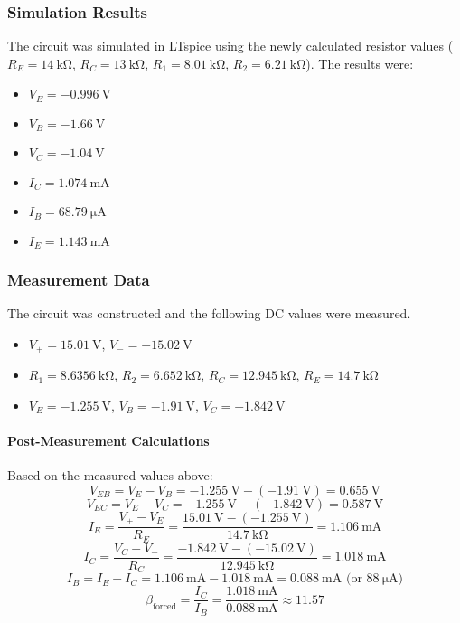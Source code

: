 \documentclass[12pt]{article}
\begin{document}
\subsubsection{Simulation Results}
The circuit was simulated in LTspice using the newly calculated resistor values ($R_E=\SI{14}{\kilo\ohm}$, $R_C=\SI{13}{\kilo\ohm}$, $R_1=\SI{8.01}{\kilo\ohm}$, $R_2=\SI{6.21}{\kilo\ohm}$). The results were:
\begin{itemize}
    \item $V_E = \SI{-0.996}{\volt}$
    \item $V_B = \SI{-1.66}{\volt}$
    \item $V_C = \SI{-1.04}{\volt}$
    \item $I_C = \SI{1.074}{\milli\ampere}$
    \item $I_B = \SI{68.79}{\micro\ampere}$
    \item $I_E = \SI{1.143}{\milli\ampere}$
\end{itemize}

\subsubsection{Measurement Data}
The circuit was constructed and the following DC values were measured.
\begin{itemize}
    \item $V_+ = \SI{15.01}{\volt}$, $V_- = \SI{-15.02}{\volt}$
    \item $R_1 = \SI{8.6356}{\kilo\ohm}$, $R_2 = \SI{6.652}{\kilo\ohm}$, $R_C = \SI{12.945}{\kilo\ohm}$, $R_E = \SI{14.7}{\kilo\ohm}$ %
    \item $V_E = \SI{-1.255}{\volt}$, $V_B = \SI{-1.91}{\volt}$, $V_C = \SI{-1.842}{\volt}$
\end{itemize}

\paragraph{Post-Measurement Calculations}
Based on the measured values above:
$$
V_{EB} = V_E - V_B = \SI{-1.255}{\volt} - (\SI{-1.91}{\volt}) = \SI{0.655}{\volt}
$$
$$
V_{EC} = V_E - V_C = \SI{-1.255}{\volt} - (\SI{-1.842}{\volt}) = \SI{0.587}{\volt}
$$
$$
I_E = \frac{V_{+} - V_E}{R_E} = \frac{\SI{15.01}{\volt} - (\SI{-1.255}{\volt})}{\SI{14.7}{\kilo\ohm}} = \SI{1.106}{\milli\ampere}
$$
$$
I_C = \frac{V_C - V_{-}}{R_C} = \frac{\SI{-1.842}{\volt} - (\SI{-15.02}{\volt})}{\SI{12.945}{\kilo\ohm}} = \SI{1.018}{\milli\ampere}
$$
$$
I_B = I_E - I_C = \SI{1.106}{\milli\ampere} - \SI{1.018}{\milli\ampere} = \SI{0.088}{\milli\ampere} \text{ (or } \SI{88}{\micro\ampere})
$$
$$
\beta_{\text{forced}} = \frac{I_C}{I_B} = \frac{\SI{1.018}{\milli\ampere}}{\SI{0.088}{\milli\ampere}} \approx 11.57
$$
\end{document}
